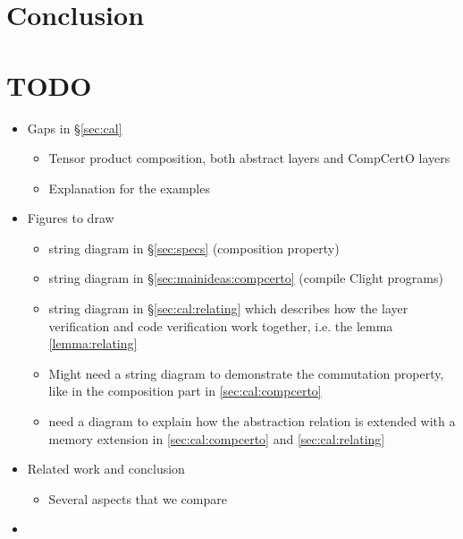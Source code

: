 \documentclass[acmsmall,review,anonymous]{acmart}\settopmatter{printfolios=true,printccs=false,printacmref=false}
\begin{document}


\section{Conclusion} %

\section{TODO}
\begin{itemize}
\item Gaps in \S\ref{sec:cal}
  \begin{itemize}
  \item Tensor product composition, both abstract layers
    and CompCertO layers
  \item Explanation for the examples
  \end{itemize}
\item Figures to draw
  \begin{itemize}
  \item string diagram in \S\ref{sec:specs} (composition property)
  \item string diagram in \S\ref{sec:mainideas:compcerto} (compile Clight programs)
  \item string diagram in \S\ref{sec:cal:relating}
    which describes how the layer verification and code verification
    work together, i.e. the lemma \ref{lemma:relating}
  \item Might need a string diagram to demonstrate
    the commutation property,
    like in the composition part in \ref{sec:cal:compcerto}
  \item need a diagram to explain how the abstraction relation
    is extended with a memory extension
    in \ref{sec:cal:compcerto} and \ref{sec:cal:relating}
  \end{itemize}
\item Related work and conclusion
  \begin{itemize}
  \item Several aspects that we compare
  \end{itemize}
\item 
\end{itemize}


% 


\newpage
\appendix
\end{document}
